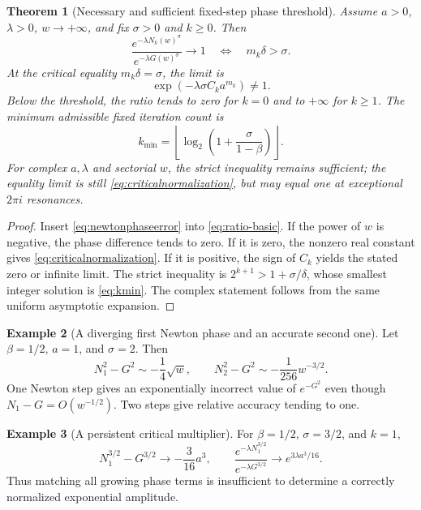 \documentclass[11pt,a4paper]{article}
\newtheorem{theorem}{Theorem}[section]
\theoremstyle{definition}
\newtheorem{example}[theorem]{Example}
\theoremstyle{remark}
\numberwithin{equation}{section}
\begin{document}
\begin{theorem}[Necessary and sufficient fixed-step phase threshold]\label{thm:sharpthreshold}
Assume $a>0$, $\lambda>0$, $w\to+\infty$, and fix $\sigma>0$ and $k\ge0$. Then
\begin{equation}\label{eq:iffthreshold}
 \frac{e^{-\lambda N_k(w)^\sigma}}{e^{-\lambda G(w)^\sigma}}
 \longrightarrow1
 \quad\Longleftrightarrow\quad m_k\delta>\sigma.
\end{equation}
At the critical equality $m_k\delta=\sigma$, the limit is
\begin{equation}\label{eq:criticalnormalization}
 \exp(-\lambda\sigma C_k a^{m_k})\ne1.
\end{equation}
Below the threshold, the ratio tends to zero for $k=0$ and to $+\infty$ for $k\ge1$. The minimum admissible fixed iteration count is
\begin{equation}\label{eq:kmin}
 k_{\min}=\left\lfloor\log_2\left(1+\frac{\sigma}{1-\beta}\right)\right\rfloor.
\end{equation}
For complex $a,\lambda$ and sectorial $w$, the strict inequality remains sufficient; the equality limit is still \eqref{eq:criticalnormalization}, but may equal one at exceptional $2\pi i$ resonances.
\end{theorem}
\begin{proof}
Insert \eqref{eq:newtonphaseerror} into \eqref{eq:ratio-basic}. If the power of $w$ is negative, the phase difference tends to zero. If it is zero, the nonzero real constant gives \eqref{eq:criticalnormalization}. If it is positive, the sign of $C_k$ yields the stated zero or infinite limit. The strict inequality is $2^{k+1}>1+\sigma/\delta$, whose smallest integer solution is \eqref{eq:kmin}. The complex statement follows from the same uniform asymptotic expansion.
\end{proof}

\begin{example}[A diverging first Newton phase and an accurate second one]\label{ex:newtonsquare}
Let $\beta=1/2$, $a=1$, and $\sigma=2$. Then
\[
 N_1^2-G^2\sim-\frac14\sqrt w,
 \qquad N_2^2-G^2\sim-\frac1{256}w^{-3/2}.
\]
One Newton step gives an exponentially incorrect value of $e^{-G^2}$ even though $N_1-G=O(w^{-1/2})$. Two steps give relative accuracy tending to one.
\end{example}

\begin{example}[A persistent critical multiplier]\label{ex:critical}
For $\beta=1/2$, $\sigma=3/2$, and $k=1$,
\[
 N_1^{3/2}-G^{3/2}\longrightarrow-\frac3{16}a^3,
 \qquad
 \frac{e^{-\lambda N_1^{3/2}}}{e^{-\lambda G^{3/2}}}
 \longrightarrow e^{3\lambda a^3/16}.
\]
Thus matching all growing phase terms is insufficient to determine a correctly normalized exponential amplitude.
\end{example}
\end{document}
